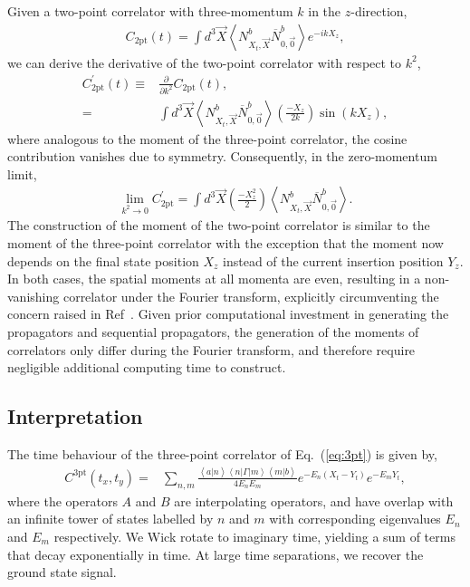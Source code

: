 \documentclass{PoS}
\begin{document}
Given a two-point correlator with three-momentum $k$ in the $z$-direction,
\begin{align}
C_{\text{2pt}}(t) = \int d^3\vec{X} \left< N^b_{X_t,\vec{X}}\overline{N}^b_{0,\vec{0}}\right> e^{-ikX_z},
\label{eq:2pt}
\end{align}
we can derive the derivative of the two-point correlator with respect to $k^2$,
\begin{align}
C^\prime_{\text{2pt}}(t) \equiv & \frac{\partial}{\partial k^2} C_{\text{2pt}}(t),  \nonumber\\
= & \int d^3\vec{X} \left<N^b_{X_t, \vec{X}}\overline{N}^b_{0,\vec{0}} \right> \left(\frac{-X_z}{2k}\right) \sin\left(kX_z\right),
\label{eq:2ptmoment}
\end{align}
where analogous to the moment of the three-point correlator, the cosine contribution vanishes due to symmetry.  Consequently, in the zero-momentum limit,
\begin{align}
\lim_{k^2\rightarrow 0 } C^\prime_{\text{2pt}} = \int d^3\vec{X} \left(\frac{-X_z^2}{2}\right)\left<N^b_{X_t, \vec{X}}\overline{N}^b_{0,\vec{0}} \right>.
\label{eq:2ptmoment0}
\end{align}
The construction of the moment of the two-point correlator is similar to the moment of the three-point correlator with the exception that the moment now depends on the final state position $X_z$ instead of the current insertion position $Y_z$. In both cases, the spatial moments at all momenta are even, resulting in a non-vanishing correlator under the Fourier transform, explicitly circumventing the concern raised in Ref~\cite{Wilcox:2002zt}.  Given prior computational investment in generating the propagators and sequential propagators, the generation of the moments of correlators only differ during the Fourier transform, and therefore require negligible additional computing time to construct.

\subsection{Interpretation}
The time behaviour of the three-point correlator of Eq.~(\ref{eq:3pt}) is given by,
\begin{align}
C^{\text{3pt}}(t_x, t_y)  = & \sum_{n,m} \frac{\left<a | n\right>\left<n| \Gamma |m\right>\left<m | b\right>}{4E_n E_m} e^{-E_n(X_t - Y_t)} e^{-E_m Y_t} \label{eq:3ptfit},
\end{align}
where the operators $A$ and $B$ are interpolating operators, and have overlap with an infinite tower of states labelled by $n$ and $m$ with corresponding eigenvalues $E_n$ and $E_m$ respectively. We Wick rotate to imaginary time, yielding a sum of terms that decay exponentially in time. At large time separations, we recover the ground state signal.
\end{document}
